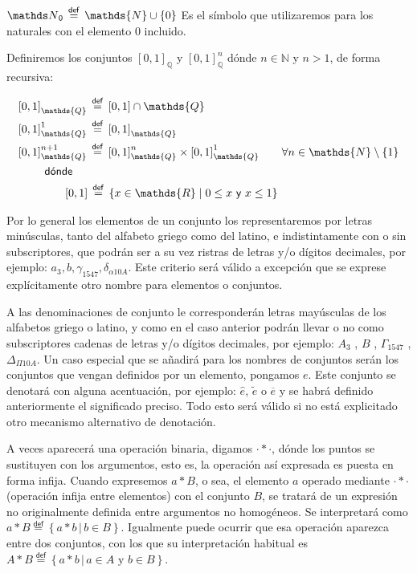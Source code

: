 \documentclass[final,12pt,a4paper,twoside,fleqn]{extbook}
\newcommand{\sunion}{\ensuremath{\cup}}
\newcommand{\mathdef}{\ensuremath{\stackrel{\mathsf{def}}{{}={}}}}
\newcommand{\set}[1]{\ensuremath{\left\lbrace{#1}\right\rbrace}}
\newcommand{\setN}{\ensuremath{\mathds{N}}}
\newcommand{\setR}{\ensuremath{\mathds{R}}}
\newcommand{\setQ}{\ensuremath{\mathds{Q}}}
\newcommand{\conj}[1]{\ensuremath{\left\lbrace{#1}\right\rbrace}}
\theoremstyle{definition}
\theoremstyle{remark}
\begin{document}
\(\setNz \mathdef \setN \sunion \set{0}\) Es el símbolo que utilizaremos
para los naturales con el elemento \(0\) incluido.

Definiremos los conjuntos \({[0,1]}_{\setQ}\) y \({[0,1]}^{n}_{\setQ}\) dónde
\(n\in\setN\) y \(n > 1\), de forma recursiva:



\begin{align}
&{\left[{0,1}\right]}_{\setQ} \mathdef {\left[{0,1}\right]}\cap{\setQ}\\
&{\left[{0,1}\right]}^{1}_{\setQ} \mathdef {\left[{0,1}\right]}_{\setQ}\\
&{\left[{0,1}\right]}^{n+1}_{\setQ} \mathdef {\left[{0,1}\right]}^{n}_{\setQ}
\times {\left[{0,1}\right]}^{1}_{\setQ} \qquad \forall
n\in{\setN\setminus\set{1}}\\
&\qquad\mbox{\textsf{   dónde    }} \\
&\qquad\qquad\left[0,1\right] 
\mathdef 
\set{{x \in \setR} {\;|\;} {0 \leq x} \textsf{ y } {x \leq 1}}
\end{align}



	Por lo general los elementos de un conjunto los representaremos por
letras minúsculas, tanto del alfabeto griego como del latino, e
indistintamente con o sin subscriptores, que podrán ser a su vez ristras de
letras y/o dígitos decimales, por ejemplo: \(a_3 , b , \gamma_{1547} ,
\delta_{\alpha 10 A}\). Este criterio será válido a excepción que se exprese
explícitamente otro nombre para elementos o conjuntos.



	A las denominaciones de conjunto le corresponderán letras mayúsculas de
los alfabetos griego o latino, y como en el caso anterior podrán llevar o no
como subscriptores cadenas de letras y/o dígitos decimales, por ejemplo:
\(A_3\) , \(B\) , \(\Gamma_{1547}\) , \(\Delta_{{\Pi}10A}\). Un caso especial
que se añadirá para los nombres de conjuntos serán los conjuntos que vengan
definidos por un elemento, pongamos \(e\). Este conjunto se denotará con
alguna acentuación, por ejemplo: \(\widehat{e}\), \(\widetilde{e}\) o
\(\overline{e}\) y se habrá definido anteriormente el significado preciso.
Todo esto será válido si no está explicitado otro mecanismo alternativo de
denotación.



	A veces aparecerá una operación binaria, digamos \(\cdot * \cdot\), dónde
los puntos se sustituyen con los argumentos, esto es, la operación así
expresada es puesta en forma infija. Cuando expresemos \(a * B\), o sea, el
elemento \(a\) operado mediante \(\cdot * \cdot\) (operación infija entre
elementos) con el conjunto \(B\), se tratará de un expresión no originalmente
definida entre argumentos no homogéneos. Se interpretará como \(a*B \mathdef
\conj{a*b{\,|\,} b\in B}\). Igualmente puede ocurrir que esa operación
aparezca entre dos conjuntos, con los que su interpretación habitual es \(A *
B \mathdef \conj{a*b {\,|\,} a\in A \text{ y } b\in B}\).
\end{document}
